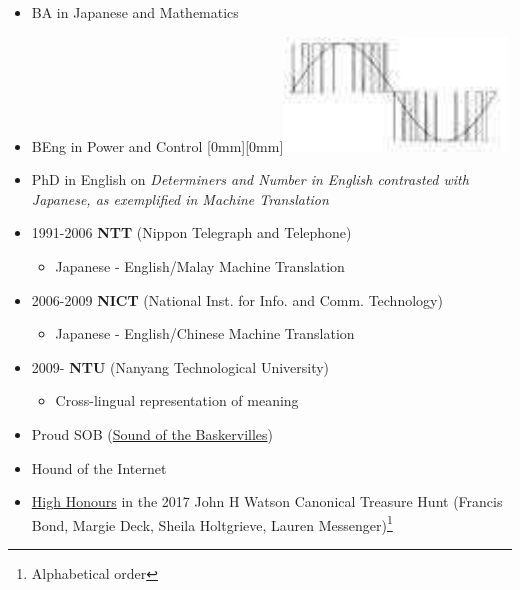 \documentclass[a4paper,landscape,headrule,footrule,xetex,25pt]{foils}
\begin{document}
\begin{itemize}\addtolength{\itemsep}{-1ex}
\item BA in Japanese and Mathematics 
\item BEng in Power and Control %
  \raisebox{-2ex}[0mm][0mm]{\includegraphics{pics/pwm}}
\item PhD in English on  \textit{Determiners and Number in English
  contrasted with Japanese,  as exemplified in Machine
  Translation} 
\item 1991-2006 \textbf{NTT} (Nippon Telegraph and Telephone)
  \begin{itemize}
  \item Japanese - English/Malay Machine Translation
  \end{itemize}
\item 2006-2009 \textbf{NICT} (National Inst. for Info. and Comm. Technology)
  \begin{itemize}
  \item Japanese - English/Chinese Machine Translation
  \end{itemize}
\item 2009- \textbf{NTU} (Nanyang Technological University)
  \begin{itemize}
  \item Cross-lingual representation of meaning
  \end{itemize}

\newpage
\item Proud SOB (\href{www.soundofthebaskervilles.com/}{Sound of the
    Baskervilles})
\item Hound of the Internet
\item  \href{http://johnhwatsonsociety.com/treasure-hunt/results/}{High Honours} in the 2017 John H Watson Canonical Treasure Hunt 
  (Francis Bond, Margie Deck, Sheila Holtgrieve,
  Lauren Messenger)\footnote{Alphabetical order}

\end{itemize}
\end{document}
